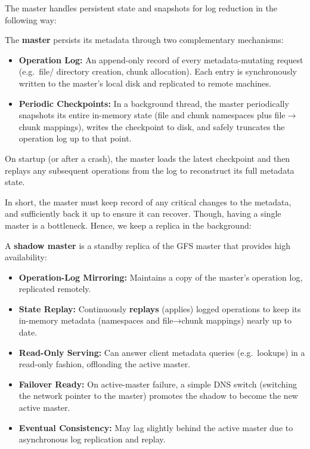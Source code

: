 \newpage 
\noindent
The master handles persistent state and snapshots for log reduction in the following way:
\begin{Def}

  The \textbf{master} persists its metadata through two complementary mechanisms:
  \begin{itemize}
    \item \textbf{Operation Log:} An append-only record of every metadata-mutating request (e.g.\ file/ directory creation, chunk allocation).  Each entry is synchronously written to the master's local disk and replicated to remote machines.
    \item \textbf{Periodic Checkpoints:} In a background thread, the master periodically snapshots its entire in-memory state (file and chunk namespaces plus file$\to$chunk mappings), writes the checkpoint to disk, and safely truncates the operation log up to that point.
  \end{itemize}
  \noindent
  On startup (or after a crash), the master loads the latest checkpoint and then replays any subsequent operations from the log to reconstruct its full metadata state.
\end{Def}
\noindent
In short, the master must keep record of any critical changes to the metadata, and sufficiently back it up to ensure it can recover. Though,
having a single master is a bottleneck. Hence, we keep a replica in the background:
\begin{Def}

  A \textbf{shadow master} is a standby replica of the GFS master that provides high availability:
  \begin{itemize}
    \item \textbf{Operation-Log Mirroring:} Maintains a copy of the master's operation log, replicated remotely.
    \item \textbf{State Replay:} Continuously \textbf{replays} (applies) logged operations to keep its in-memory metadata (namespaces and file→chunk mappings) nearly up to date.
    \item \textbf{Read-Only Serving:} Can answer client metadata queries (e.g.\ lookups) in a read-only fashion, offloading the active master.
    \item \textbf{Failover Ready:} On active-master failure, a simple DNS switch (switching the network pointer to the master) promotes the shadow to become the new active master.
    \item \textbf{Eventual Consistency:} May lag slightly behind the active master due to asynchronous log replication and replay.
  \end{itemize}
\end{Def}

